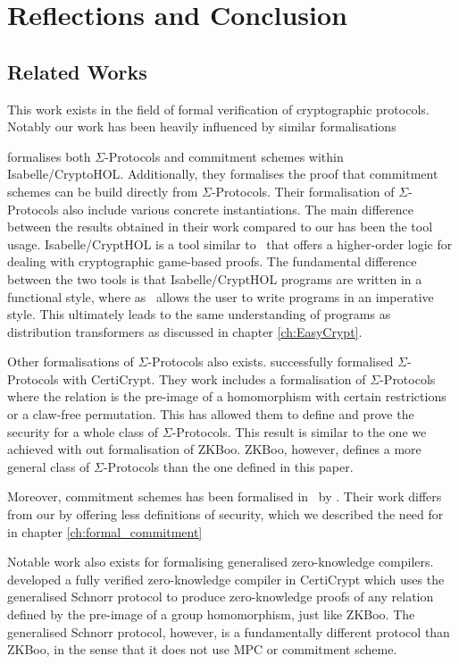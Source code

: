 \chapter{Reflections and Conclusion}
\label{sec:reflection_conclusion}

\section{Related Works}
\label{sec:related_works}
This work exists in the field of formal verification of cryptographic protocols.
Notably our work has been heavily influenced by similar formalisations
\cite{cryptoeprint:2019:1185,DBLP:journals/corr/MetereD17,certicrypt_sigma,zkcrypt,Yao}

\citet{cryptoeprint:2019:1185} formalises both $\Sigma$-Protocols and
commitment schemes within Isabelle/CryptoHOL. Additionally, they formalises
the proof that commitment schemes can be build directly from $\Sigma$-Protocols.
Their formalisation of $\Sigma$-Protocols also include various concrete instantiations.
The main difference between the results obtained in their work compared to our
has been the tool usage. Isabelle/CryptHOL is a tool similar to \easycrypt\ that
offers a higher-order logic for dealing with cryptographic game-based proofs.
The fundamental difference between the two tools is that Isabelle/CryptHOL
programs are written in a functional style, where as \easycrypt\ allows the user
to write programs in an imperative style. This ultimately leads to the same
understanding of programs as distribution transformers as discussed in chapter
\ref{ch:EasyCrypt}.

Other formalisations of $\Sigma$-Protocols also exists. \citet{certicrypt_sigma}
successfully formalised $\Sigma$-Protocols with CertiCrypt. They work includes a
formalisation of $\Sigma$-Protocols where the relation is the pre-image of a
homomorphism with certain restrictions or a claw-free permutation. This has
allowed them to define and prove the security for a whole class of
$\Sigma$-Protocols. This result is similar to the one we achieved with out
formalisation of ZKBoo. ZKBoo, however, defines a more general class of
$\Sigma$-Protocols than the one defined in this paper.

Moreover, commitment schemes has been formalised in \easycrypt\ by
\citet{DBLP:journals/corr/MetereD17}. Their work differs from our by offering
less definitions of security, which we described the need for in chapter \ref{ch:formal_commitment}

Notable work also exists for formalising generalised zero-knowledge compilers.
\citet{zkcrypt} developed a fully verified zero-knowledge compiler in CertiCrypt
which uses the generalised Schnorr protocol to produce zero-knowledge proofs of
any relation defined by the pre-image of a group homomorphism, just like ZKBoo.
The generalised Schnorr protocol, however, is a fundamentally different protocol
than ZKBoo, in the sense that it does not use MPC or commitment scheme.

